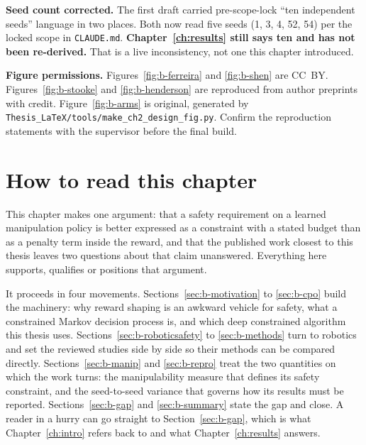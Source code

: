 \begin{draftnote}
\textbf{Seed count corrected.} The first draft carried pre-scope-lock ``ten independent seeds''
language in two places. Both now read five seeds (1, 3, 4, 52, 54) per the locked scope in
\texttt{CLAUDE.md}. \textbf{Chapter~\ref{ch:results} still says ten and has not been
re-derived.} That is a live inconsistency, not one this chapter introduced.

\textbf{Figure permissions.} Figures~\ref{fig:b-ferreira} and \ref{fig:b-shen} are CC~BY.
Figures~\ref{fig:b-stooke} and \ref{fig:b-henderson} are reproduced from author preprints with
credit. Figure~\ref{fig:b-arms} is original, generated by
\texttt{Thesis\_LaTeX/tools/make\_ch2\_design\_fig.py}. Confirm the reproduction statements with
the supervisor before the final build.
\end{draftnote}

\section{How to read this chapter}\label{sec:b-guide}

This chapter makes one argument: that a safety requirement on a learned manipulation policy is
better expressed as a constraint with a stated budget than as a penalty term inside the reward,
and that the published work closest to this thesis leaves two questions about that claim
unanswered. Everything here supports, qualifies or positions that argument.

It proceeds in four movements. Sections~\ref{sec:b-motivation} to \ref{sec:b-cpo} build the
machinery: why reward shaping is an awkward vehicle for safety, what a constrained Markov
decision process is, and which deep constrained algorithm this thesis uses.
Sections~\ref{sec:b-roboticsafety} to \ref{sec:b-methods} turn to robotics and set the reviewed
studies side by side so their methods can be compared directly.
Sections~\ref{sec:b-manip} and \ref{sec:b-repro} treat the two quantities on which the work
turns: the manipulability measure that defines its safety constraint, and the seed-to-seed
variance that governs how its results must be reported. Sections~\ref{sec:b-gap} and
\ref{sec:b-summary} state the gap and close. A reader in a hurry can go straight to
Section~\ref{sec:b-gap}, which is what Chapter~\ref{ch:intro} refers back to and what
Chapter~\ref{ch:results} answers.


